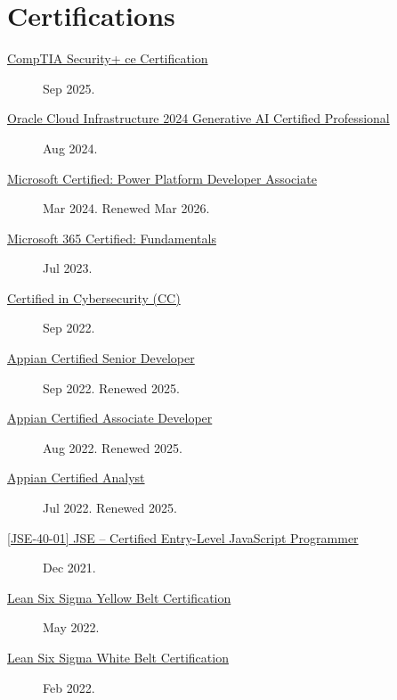 \documentclass{article}
\begin{document}
\section*{Certifications}\vspace{-0.5em}
\begin{description}
  \item [\href{https://www.credly.com/badges/d6475abc-a1b4-4731-9699-90f464d3d389/public_url}{CompTIA Security+ ce Certification}] Sep 2025.
  \item [\href{https://sirkoik.github.io/CurriculumVitae/certifications/Oracle-Cloud-Infrastructure-2024-Generative-AI-Certified-Professional/Oracle-Cloud-Infrastructure-2024-Generative-AI-Certified-Professional-eCertificate.pdf}{Oracle Cloud Infrastructure 2024 Generative AI Certified Professional}] Aug 2024.
  \item [\href{https://learn.microsoft.com/api/credentials/share/en-us/AlexKoikCestone-7541/99C5F49578EE2C21?sharingId=DCF7D068E6ED12E6}{Microsoft Certified: Power Platform Developer Associate}] Mar 2024. Renewed Mar 2026.
  \item [\href{https://learn.microsoft.com/api/credentials/share/en-us/AlexKoikCestone-7541/34191BBB3EBF09A3?sharingId=DCF7D068E6ED12E6}{Microsoft 365 Certified: Fundamentals}] Jul 2023.
  \item [\href{https://www.credly.com/badges/f0aab7ce-2f5d-4569-8705-3dc23fc34200/public_url}{Certified in Cybersecurity (CC)}] Sep 2022.
  \item [\href{https://community.appian.com/members/alexanderk5370?badge=cert&now=638483685447952604}{Appian Certified Senior Developer}] Sep 2022. Renewed 2025.
  \item [\href{https://community.appian.com/members/alexanderk5370?badge=cert&now=638483685447952604}{Appian Certified Associate Developer}] Aug 2022. Renewed 2025.
  \item [\href{https://community.appian.com/members/alexanderk5370?badge=cert&now=638483685447952604}{Appian Certified Analyst}] Jul 2022. Renewed 2025.
  \item [\href{https://www.credly.com/badges/e75210e4-8d08-43ea-af72-ec70ef666eee/public_url}{[JSE-40-01] JSE – Certified Entry-Level JavaScript Programmer}] Dec 2021.
  \item [\href{https://api.badgr.io/public/assertions/KE5P9gfoQ7S3-hpvZP4PIQ}{Lean Six Sigma Yellow Belt Certification}] May 2022.
  \item [\href{https://api.badgr.io/public/assertions/JhPP0s2rQWWGrc9ZkYqhkg}{Lean Six Sigma White Belt Certification}] Feb 2022.

\end{description}
\end{document}
